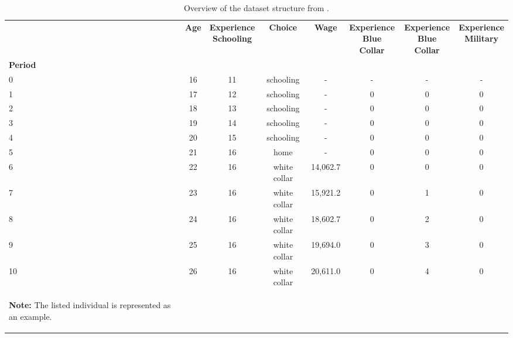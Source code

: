 \begin{ThreePartTable}

	\begin{longtable}{@{}lccccccc@{}}
		\caption{Overview of the dataset structure from \citet{Keane.1997}.}
		\label{tab:BasicDataStructure}
		
		\setlength\extrarowheight{2.5pt}
		
		\\
		\toprule
       & \textbf{Age}    & \thead{\textbf{Experience}\\ \textbf{Schooling}}  & \textbf{Choice} & \textbf{Wage} & \thead{\textbf{Experience}\\ \textbf{Blue Collar}} & \thead{\textbf{Experience}\\ \textbf{Blue Collar}} & \thead{\textbf{Experience}\\ \textbf{Military}}   \\
\textbf{Period} &        &            &        &      &             &               &       \\ \midrule
		\endfirsthead
		
0  & 16 & 11 & schooling    & - & - & - & -\\
1  & 17 & 12 & schooling    & - & 0 & 0 & 0\\
2  & 18 & 13 & schooling    & - & 0 & 0 & 0\\
3  & 19 & 14 & schooling    & - & 0 & 0 & 0\\
4  & 20 & 15 & schooling    & - & 0 & 0 & 0\\
5  & 21 & 16 & home         & - & 0 & 0 & 0\\
6  & 22 & 16 & white collar & 14,062.7 & 0 & 0 & 0\\
7  & 23 & 16 & white collar & 15,921.2 & 0 & 1 & 0\\
8  & 24 & 16 & white collar & 18,602.7 & 0 & 2 & 0\\
9  & 25 & 16 & white collar & 19,694.0 & 0 & 3 & 0\\
10 & 26 & 16 & white collar & 20,611.0 & 0 & 4 & 0\\
  \bottomrule
	\begin{TableNotes}
		\item \textbf{Note:} The listed individual is represented as an example. 
	\end{TableNotes}		
	\end{longtable}
\end{ThreePartTable}
